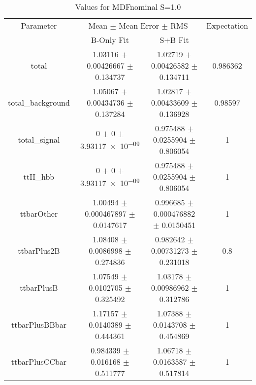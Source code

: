 \begin{table}
\centering
\caption{Values for MDFnominal S=1.0}
\begin{tabular}{cccc}
\toprule
Parameter & \multicolumn{2}{c}{Mean $\pm$ Mean Error $\pm$ RMS} & Expectation\\
 & B-Only Fit & S+B Fit & \\
\midrule
total & \num{1.03116} $\pm$ \num{0.00426667} $\pm$ \num{0.134737} & \num{1.02719} $\pm$ \num{0.00426582} $\pm$ \num{0.134711} & \num{0.986362}\\
total\_background & \num{1.05067} $\pm$ \num{0.00434736} $\pm$ \num{0.137284} & \num{1.02817} $\pm$ \num{0.00433609} $\pm$ \num{0.136928} & \num{0.98597}\\
total\_signal & \num{0} $\pm$ \num{0} $\pm$ \num{3.93117e-09} & \num{0.975488} $\pm$ \num{0.0255904} $\pm$ \num{0.806054} & \num{1}\\
ttH\_hbb & \num{0} $\pm$ \num{0} $\pm$ \num{3.93117e-09} & \num{0.975488} $\pm$ \num{0.0255904} $\pm$ \num{0.806054} & \num{1}\\
ttbarOther & \num{1.00494} $\pm$ \num{0.000467897} $\pm$ \num{0.0147617} & \num{0.996685} $\pm$ \num{0.000476882} $\pm$ \num{0.0150451} & \num{1}\\
ttbarPlus2B & \num{1.08408} $\pm$ \num{0.0086998} $\pm$ \num{0.274836} & \num{0.982642} $\pm$ \num{0.00731273} $\pm$ \num{0.231018} & \num{0.8}\\
ttbarPlusB & \num{1.07549} $\pm$ \num{0.0102705} $\pm$ \num{0.325492} & \num{1.03178} $\pm$ \num{0.00986962} $\pm$ \num{0.312786} & \num{1}\\
ttbarPlusBBbar & \num{1.17157} $\pm$ \num{0.0140389} $\pm$ \num{0.444361} & \num{1.07388} $\pm$ \num{0.0143708} $\pm$ \num{0.454869} & \num{1}\\
ttbarPlusCCbar & \num{0.984339} $\pm$ \num{0.016168} $\pm$ \num{0.511777} & \num{1.06718} $\pm$ \num{0.0163587} $\pm$ \num{0.517814} & \num{1}\\
\bottomrule
\end{tabular}
\end{table}